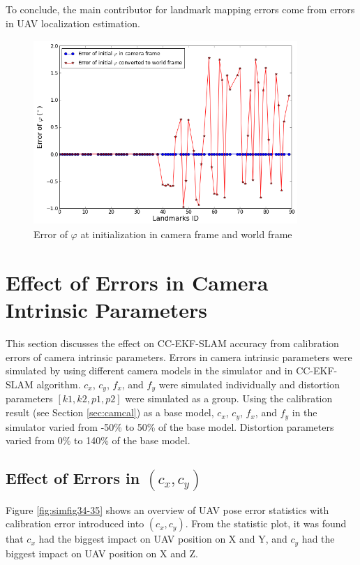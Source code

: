 To conclude, the main contributor for landmark mapping errors come
from errors in UAV localization estimation.

\begin{figure}[h] %
  \centering
  \includegraphics[width=10cm, height=7cm]{./Figures/SimulationFigures/Figure26.png}
  \caption{Error of $\varphi$ at initialization in camera frame and
    world frame}
  \label{fig:simfig26}
\end{figure}
\FloatBarrier

\section{Effect of Errors in Camera Intrinsic Parameters}
This section discusses the effect on CC-EKF-SLAM accuracy from
calibration errors of camera intrinsic parameters. Errors in camera
intrinsic parameters were simulated by using different 
camera models in the simulator and in CC-EKF-SLAM algorithm.
$c_{x}$, $c_{y}$, $f_{x}$, and $f_{y}$ were simulated individually and
distortion parameters $[k1, k2, p1, p2]$ were simulated as a group.
Using the calibration result (see Section \ref{sec:camcal}) as a
base model, $c_{x}$, $c_{y}$, $f_{x}$, and $f_{y}$ in the simulator
varied from -50\% to 50\% of the base model. Distortion
parameters varied from 0\% to 140\% of the base model.

\subsection{Effect of Errors in $(c_{x}, c_{y})$}
Figure \ref{fig:simfig34-35} shows an overview of UAV pose error
statistics with calibration error introduced into $(c_{x}, c_{y})$. From
the statistic plot, it was found that $c_x$ had the biggest impact on UAV
position on X and Y, and $c_y$ had the biggest impact on UAV position on X
and Z.

